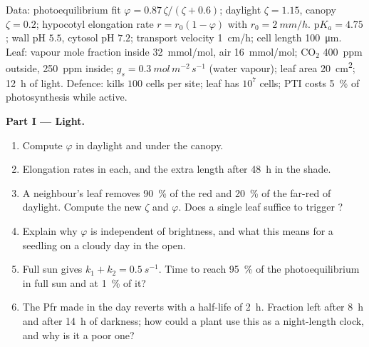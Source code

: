 \begin{problem}
\label{pb:b3:plant-molecular-physiology:1}
Data: photoequilibrium fit $\varphi = 0.87\,\zeta/(\zeta + 0.6)$;
daylight $\zeta = 1.15$, canopy $\zeta = 0.2$; hypocotyl elongation
rate $r = r_{0}(1 - \varphi)$ with $r_{0} = \qty{2}{mm/h}$. 
$\mathrm{p}K_{a} = 4.75$; wall pH $5.5$, cytosol pH $7.2$; transport
velocity \qty{1}{cm/h}; cell length \qty{100}{\micro m}. Leaf: vapour
mole fraction inside \qty{32}{mmol/mol}, air \qty{16}{mmol/mol};
CO$_{2}$ \qty{400}{ppm} outside, \qty{250}{ppm} inside; $g_{s} =
\qty{0.3}{mol\,m^{-2}\,s^{-1}}$ (water vapour); leaf area
\qty{20}{cm^2}; \qty{12}{h} of light. Defence: 
kills $100$ cells per site; leaf has $10^{7}$ cells; PTI costs
\qty{5}{\%} of photosynthesis while active.

\medskip
\noindent\textbf{Part I --- Light.}
\begin{enumerate}
  \item Compute $\varphi$ in daylight and under the canopy.
  \item Elongation rates in each, and the extra length after
        \qty{48}{h} in the shade.
  \item A neighbour's leaf removes \qty{90}{\%} of the red and
        \qty{20}{\%} of the far-red of daylight. Compute the new $\zeta$
        and $\varphi$. Does a single leaf suffice to trigger ?
  \item Explain why $\varphi$ is independent of brightness, and what
        this means for a seedling on a cloudy day in the open.
  \item Full sun gives $k_{1} + k_{2} = \qty{0.5}{s^{-1}}$. Time to reach
        \qty{95}{\%} of the photoequilibrium in full sun and at
        \qty{1}{\%} of it?
  \item The Pfr made in the day reverts with a half-life of \qty{2}{h}.
        Fraction left after \qty{8}{h} and after \qty{14}{h} of darkness;
        how could a plant use this as a night-length clock, and why is
        it a poor one?
\end{enumerate}


\end{problem}
